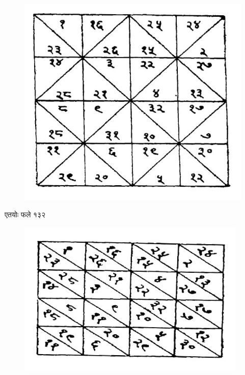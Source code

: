 \documentclass[11pt, openany]{book}
\begin{document}
\begin{center}
\begin{figure}[h!]
  \centering
  \includegraphics[scale=0.3]{graphics/413.jpg}
\end{figure}
\vspace{-2mm}

एतयोः फले १३२
\end{center}

\newpage

\begin{figure}[h!]
    \centering
    \includegraphics[scale=0.3]{graphics/414_1.jpg}
    
\end{figure}
\end{document}
